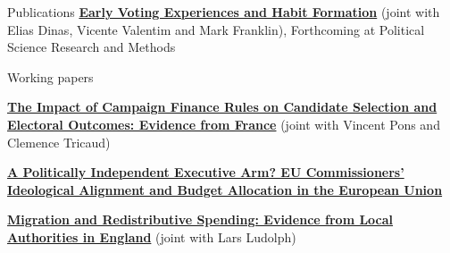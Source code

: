 \documentclass{resume} %
\begin{document}

%	
%	







\begin{rSection}{Publications} 
\href{https://nikolajbroberg.org/publication/DINAS_VALENTIM_BROBERG_FRANKLIN/SSRN-id3466515.pdf}{\textbf{Early Voting Experiences and Habit Formation}} (joint with Elias Dinas, Vicente Valentim and Mark Franklin),  Forthcoming at Political Science Research and Methods 
  \end{rSection}
 

\begin{rSection}{Working papers}


\href{https://nikolajbroberg.org/publication/BROBERG_PONS_TRICAUD/w29805.pdf}{\textbf{The Impact of Campaign Finance Rules on Candidate Selection and Electoral Outcomes: Evidence from France}} (joint with Vincent Pons and Clemence Tricaud)
 

\href{https://nikolajbroberg.org/publication/Broberg/EC_paper.pdf}{\textbf{A Politically Independent Executive Arm? EU Commissioners' Ideological Alignment and Budget Allocation in the European Union}}


\href{https://nikolajbroberg.org/publication/BROBERG_LUDOLPH/SSRN-id3972303.pdf}{\textbf{Migration and Redistributive Spending: Evidence from Local Authorities in England}} (joint with Lars Ludolph)



 \end{rSection}
 
\end{document}
